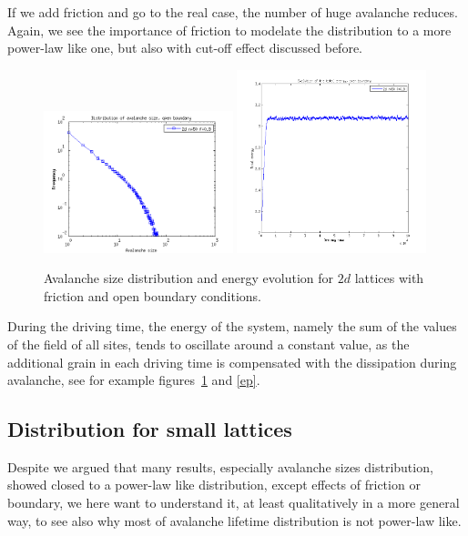If we add friction and go to the real case, the number of huge avalanche reduces. 
Again, we see the importance of friction to modelate the distribution to a more power-law like one, but also with cut-off effect discussed before. 
\begin{figure} 
\begin{center}
\includegraphics[width=0.49\textwidth]{results/2sof.png}
\includegraphics[width=0.49\textwidth]{results/2eof.png}
\caption{Avalanche size distribution and energy evolution for $2d$ lattices with friction and open boundary conditions.}
\label{so}
\end{center}
\end{figure} 




During the driving time, the energy of the system, namely the sum of the values of the field of all sites,
tends to oscillate around a constant value, as the additional grain in each driving time is compensated with the dissipation during avalanche, 
see for example figures~\ref{so} and \ref{ep}.





\subsection{Distribution for small lattices}

Despite we argued that many results, especially avalanche sizes distribution, showed closed to a power-law like distribution, 
except effects of friction or boundary, we here want to understand it, at least qualitatively in a more general way,
to see also why most of avalanche lifetime distribution is not power-law like.


